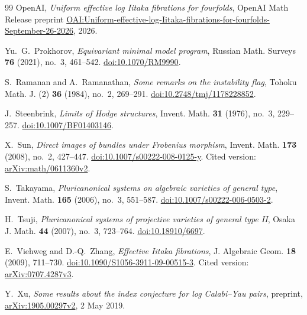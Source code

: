 \begin{thebibliography}{99}
OpenAI, \emph{Uniform effective log Iitaka fibrations for fourfolds},
OpenAI Math Release preprint
\href{https://github.com/openai/math/blob/main/preprints/Uniform-effective-log-Iitaka-fibrations-for-fourfolds-September-26-2026/paper.pdf}{OAI:Uniform-effective-log-Iitaka-fibrations-for-fourfolds-September-26-2026},
2026.

Yu.~G.~Prokhorov, \emph{Equivariant minimal model program},
Russian Math. Surveys \textbf{76} (2021), no.~3, 461--542.
\href{https://doi.org/10.1070/RM9990}{doi:10.1070/RM9990}.

S.~Ramanan and A.~Ramanathan,
\emph{Some remarks on the instability flag},
Tohoku Math. J. (2) \textbf{36} (1984), no.~2, 269--291.
\href{https://doi.org/10.2748/tmj/1178228852}{doi:10.2748/tmj/1178228852}.

J.~Steenbrink, \emph{Limits of Hodge structures},
Invent. Math. \textbf{31} (1976), no.~3, 229--257.
\href{https://doi.org/10.1007/BF01403146}{doi:10.1007/BF01403146}.

X.~Sun, \emph{Direct images of bundles under Frobenius morphism},
Invent. Math. \textbf{173} (2008), no.~2, 427--447.
\href{https://doi.org/10.1007/s00222-008-0125-y}{doi:10.1007/s00222-008-0125-y}.
Cited version: \href{https://arxiv.org/abs/math/0611360v2}{arXiv:math/0611360v2}.

S.~Takayama, \emph{Pluricanonical systems on algebraic varieties of general type},
Invent. Math. \textbf{165} (2006), no.~3, 551--587.
\href{https://doi.org/10.1007/s00222-006-0503-2}{doi:10.1007/s00222-006-0503-2}.

H.~Tsuji, \emph{Pluricanonical systems of projective varieties of general type II},
Osaka J. Math. \textbf{44} (2007), no.~3, 723--764.
\href{https://doi.org/10.18910/6697}{doi:10.18910/6697}.

E.~Viehweg and D.-Q.~Zhang, \emph{Effective Iitaka fibrations},
J. Algebraic Geom. \textbf{18} (2009), 711--730.
\href{https://doi.org/10.1090/S1056-3911-09-00515-3}{doi:10.1090/S1056-3911-09-00515-3}.
Cited version: \href{https://arxiv.org/abs/0707.4287v3}{arXiv:0707.4287v3}.

Y.~Xu, \emph{Some results about the index conjecture for log Calabi--Yau pairs},
preprint, \href{https://arxiv.org/abs/1905.00297v2}{arXiv:1905.00297v2},
2 May 2019.

\end{thebibliography}
